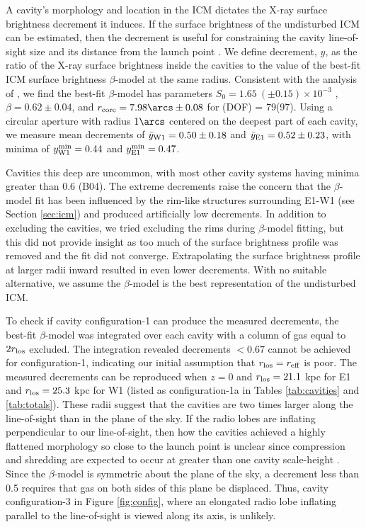 \documentclass[iop]{emulateapj}
\begin{document}
A cavity's morphology and location in the ICM dictates the X-ray
surface brightness decrement it induces. If the surface brightness of
the undisturbed ICM can be estimated, then the decrement is useful for
constraining the cavity line-of-sight size and its distance from the
launch point \citep[\ie\ \rlos\ and $z$, respectively; see][for
  details]{hydraa}. We define decrement, $y$, as the ratio of the
X-ray surface brightness inside the cavities to the value of the
best-fit ICM surface brightness $\beta$-model at the same
radius. Consistent with the analysis of \citet{schindler01}, we find
the best-fit $\beta$-model has parameters $S_0 = 1.65 ~(\pm 0.15)
\times 10^{-3}$ \sbr, $\beta = 0.62 \pm 0.04$, and $r_{\rm{core}} =
7.98\arcs \pm 0.08$ for \chisq(DOF) = 79(97). Using a circular
aperture with radius $1\arcs$ centered on the deepest part of each
cavity, we measure mean decrements of $\bar{y}_{\rm{W1}} = 0.50 \pm
0.18$ and $\bar{y}_{\rm{E1}} = 0.52 \pm 0.23$, with minima of
$y^{\rm{min}}_{\rm{W1}} = 0.44$ and $y^{\rm{min}}_{\rm{E1}} = 0.47$.

Cavities this deep are uncommon, with most other cavity systems having
minima greater than 0.6 (B04). The extreme decrements raise the
concern that the $\beta$-model fit has been influenced by the rim-like
structures surrounding E1-W1 (see Section \ref{sec:icm}) and produced
artificially low decrements. In addition to excluding the cavities, we
tried excluding the rims during $\beta$-model fitting, but this did
not provide insight as too much of the surface brightness profile was
removed and the fit did not converge. Extrapolating the surface
brightness profile at larger radii inward resulted in even lower
decrements. With no suitable alternative, we assume the $\beta$-model
is the best representation of the undisturbed ICM.

To check if cavity configuration-1 can produce the measured
decrements, the best-fit $\beta$-model was integrated over each cavity
with a column of gas equal to $2r_{\rm{los}}$ excluded. The integration
revealed decrements $< 0.67$ cannot be achieved for configuration-1,
indicating our initial assumption that $r_{\rm{los}} = r_{\rm{eff}}$ is poor. The
measured decrements can be reproduced when $z = 0$ and $r_{\rm{los}} = 21.1$
kpc for E1 and $r_{\rm{los}} = 25.3$ kpc for W1 (listed as configuration-1a
in Tables \ref{tab:cavities} and \ref{tab:totals}). These radii
suggest that the cavities are two times larger along the line-of-sight
than in the plane of the sky. If the radio lobes are inflating
perpendicular to our line-of-sight, then how the cavities achieved a
highly flattened morphology so close to the launch point is unclear
since compression and shredding are expected to occur at greater than
one cavity scale-height \citep[$D \ga 2r$;
  \eg][]{2001MNRAS.325..676B}. Since the $\beta$-model is symmetric
about the plane of the sky, a decrement less than 0.5 requires that
gas on both sides of this plane be displaced. Thus, cavity
configuration-3 in Figure \ref{fig:config}, where an elongated radio
lobe inflating parallel to the line-of-sight is viewed along its axis,
is unlikely.
\end{document}
